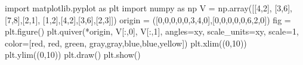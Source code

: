 \documentclass[
  letterpaper,
  DIV=11,
  numbers=noendperiod]{scrartcl}
\newenvironment{Shaded}{\begin{snugshade}}{\end{snugshade}}
\newcommand{\DecValTok}[1]{\textcolor[rgb]{0.68,0.00,0.00}{#1}}
\newcommand{\ImportTok}[1]{\textcolor[rgb]{0.00,0.46,0.62}{#1}}
\newcommand{\NormalTok}[1]{\textcolor[rgb]{0.00,0.23,0.31}{#1}}
\newcommand{\OperatorTok}[1]{\textcolor[rgb]{0.37,0.37,0.37}{#1}}
\newcommand{\StringTok}[1]{\textcolor[rgb]{0.13,0.47,0.30}{#1}}
\begin{document}
\begin{Shaded}
\begin{Highlighting}[]
\ImportTok{import}\NormalTok{ matplotlib.pyplot }\ImportTok{as}\NormalTok{ plt}
\ImportTok{import}\NormalTok{ numpy }\ImportTok{as}\NormalTok{ np}
\NormalTok{V }\OperatorTok{=}\NormalTok{ np.array([[}\DecValTok{4}\NormalTok{,}\DecValTok{2}\NormalTok{], [}\DecValTok{3}\NormalTok{,}\DecValTok{6}\NormalTok{], [}\DecValTok{7}\NormalTok{,}\DecValTok{8}\NormalTok{],[}\DecValTok{2}\NormalTok{,}\DecValTok{1}\NormalTok{], [}\DecValTok{1}\NormalTok{,}\DecValTok{2}\NormalTok{],[}\DecValTok{4}\NormalTok{,}\DecValTok{2}\NormalTok{],[}\DecValTok{3}\NormalTok{,}\DecValTok{6}\NormalTok{],[}\DecValTok{2}\NormalTok{,}\DecValTok{3}\NormalTok{]])}
\NormalTok{origin }\OperatorTok{=}\NormalTok{ ([}\DecValTok{0}\NormalTok{,}\DecValTok{0}\NormalTok{,}\DecValTok{0}\NormalTok{,}\DecValTok{0}\NormalTok{,}\DecValTok{0}\NormalTok{,}\DecValTok{3}\NormalTok{,}\DecValTok{4}\NormalTok{,}\DecValTok{0}\NormalTok{],[}\DecValTok{0}\NormalTok{,}\DecValTok{0}\NormalTok{,}\DecValTok{0}\NormalTok{,}\DecValTok{0}\NormalTok{,}\DecValTok{0}\NormalTok{,}\DecValTok{6}\NormalTok{,}\DecValTok{2}\NormalTok{,}\DecValTok{0}\NormalTok{])}
\NormalTok{fig }\OperatorTok{=}\NormalTok{ plt.figure()}
\NormalTok{plt.quiver(}\OperatorTok{*}\NormalTok{origin, V[:,}\DecValTok{0}\NormalTok{], V[:,}\DecValTok{1}\NormalTok{], angles}\OperatorTok{=}\StringTok{\textquotesingle{}xy\textquotesingle{}}\NormalTok{, scale\_units}\OperatorTok{=}\StringTok{\textquotesingle{}xy\textquotesingle{}}\NormalTok{, scale}\OperatorTok{=}\DecValTok{1}\NormalTok{, color}\OperatorTok{=}\NormalTok{[}\StringTok{\textquotesingle{}red\textquotesingle{}}\NormalTok{, }\StringTok{\textquotesingle{}red\textquotesingle{}}\NormalTok{, }\StringTok{\textquotesingle{}green\textquotesingle{}}\NormalTok{, }\StringTok{\textquotesingle{}gray\textquotesingle{}}\NormalTok{,}\StringTok{\textquotesingle{}gray\textquotesingle{}}\NormalTok{,}\StringTok{\textquotesingle{}blue\textquotesingle{}}\NormalTok{,}\StringTok{\textquotesingle{}blue\textquotesingle{}}\NormalTok{,}\StringTok{\textquotesingle{}yellow\textquotesingle{}}\NormalTok{])}
\NormalTok{plt.xlim((}\DecValTok{0}\NormalTok{,}\DecValTok{10}\NormalTok{))}
\NormalTok{plt.ylim((}\DecValTok{0}\NormalTok{,}\DecValTok{10}\NormalTok{)) }
\NormalTok{plt.draw()}
\NormalTok{plt.show()}
\end{Highlighting}
\end{Shaded}
\end{document}
